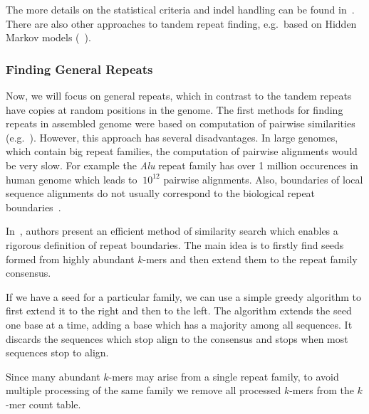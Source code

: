 The more details on the statistical criteria and indel handling can be found in~\cite{trf}. There are also other approaches to tandem repeat finding, e.g.\ based on Hidden Markov models (~\cite{tantan, nanasi2014probabilistic}).

\subsubsection{Finding General Repeats}

Now, we will focus on general repeats, which in contrast to the tandem repeats have copies at random positions in the genome.
The first methods for finding repeats in assembled genome were based on computation of pairwise similarities (e.g.~\cite{reputer, repeatfinder, recon, repeatgluer, piler}). However, this approach has several disadvantages. In large genomes, which contain big repeat families, the computation of pairwise alignments would be very slow. For example the \textit{Alu} repeat family has over 1 million occurences in human genome which leads to $~10^{12}$ pairwise alignments.
Also, boundaries of local sequence alignments do not usually correspond to the biological repeat boundaries~\cite{recon}.

In~\cite{repscout}, authors present an efficient method of similarity search which enables a rigorous definition of repeat boundaries. The main idea is to firstly find seeds formed from highly abundant $k$-mers and then extend them to the repeat family consensus.

If we have a seed for a particular family, we can use a simple greedy algorithm to first extend it to the right and then to the left. The algorithm extends the seed one base at a time, adding a base which has a majority among all sequences. It discards the sequences which stop align to the consensus and stops when most sequences stop to align.


Since many abundant $k$-mers may arise from a single repeat family, to avoid multiple processing of the same family we remove all processed $k$-mers from the $k$-mer count table.

